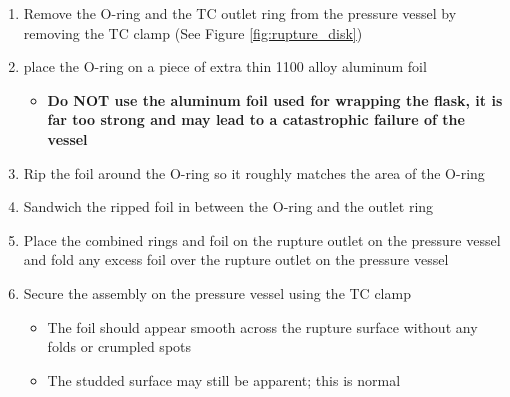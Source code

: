 \documentclass[letterpaper,11pt]{article}
\begin{document}
    \begin{enumerate}
    \item Remove the O-ring and the TC outlet ring from the pressure vessel by 
        removing the TC clamp (See Figure \ref{fig:rupture_disk})
    \item place the O-ring on a piece of extra thin 1100 alloy aluminum foil
        \begin{itemize}
        \item \textbf{Do NOT use the aluminum foil used for wrapping the flask,
            it is far too strong and may lead to a catastrophic failure of the 
            vessel}
        \end{itemize}
    \item Rip the foil around the O-ring so it roughly matches the area of 
        the O-ring
    \item Sandwich the ripped foil in between the O-ring and the outlet ring
    \item Place the combined rings and foil on the rupture outlet on the 
        pressure vessel and fold any excess foil over the rupture outlet on the 
        pressure vessel 
    \item Secure the assembly on the pressure vessel using the TC clamp
        \begin{itemize}
        \item The foil should appear smooth across the rupture surface without any 
            folds or crumpled spots
        \item The studded surface may still be apparent; this is normal
        \end{itemize}
    \end{enumerate}
\end{document}
